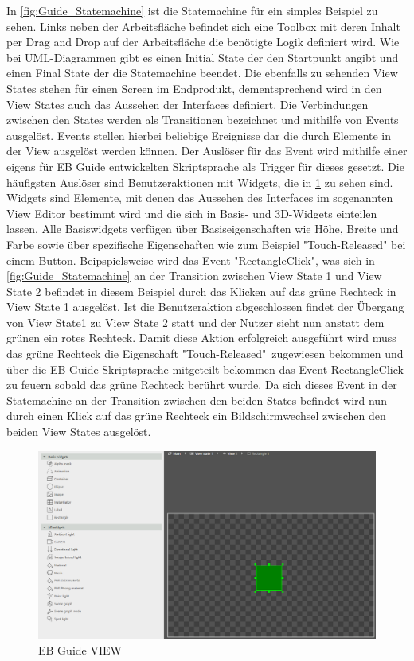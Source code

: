 In \cref{fig:Guide_Statemachine} ist die Statemachine für ein simples Beispiel zu sehen.
Links neben der Arbeitsfläche befindet sich eine Toolbox mit deren Inhalt per Drag and Drop auf der Arbeitsfläche die benötigte Logik definiert wird.
Wie bei UML-Diagrammen gibt es einen Initial State der den Startpunkt angibt und einen Final State der die Statemachine beendet.
Die ebenfalls zu sehenden View States stehen für einen Screen im Endprodukt, dementsprechend wird in den View States auch das Aussehen der Interfaces definiert.
Die Verbindungen zwischen den States werden als Transitionen bezeichnet und mithilfe von Events ausgelöst.
Events stellen hierbei beliebige Ereignisse dar die durch Elemente in der View ausgelöst werden können.
Der Auslöser für das Event wird mithilfe einer eigens für EB Guide entwickelten Skriptsprache als Trigger für dieses gesetzt.
Die häufigsten Auslöser sind Benutzeraktionen mit Widgets, die in \cref{fig:Guide_View} zu sehen sind.
Widgets sind Elemente, mit denen das Aussehen des Interfaces im sogenannten View Editor bestimmt wird und die sich in Basis- und 3D-Widgets einteilen lassen.
Alle Basiswidgets verfügen über Basiseigenschaften wie Höhe, Breite und Farbe sowie über spezifische Eigenschaften wie zum Beispiel "Touch-Released" bei einem Button.\cite{studio_guide}
Beipspielsweise wird das Event "RectangleClick", was sich in \cref{fig:Guide_Statemachine} an der Transition zwischen View State 1 und View State 2 befindet in diesem Beispiel durch das Klicken auf das grüne Rechteck in View State 1 ausgelöst.
Ist die Benutzeraktion abgeschlossen findet der Übergang von View State1 zu View State 2 statt und der Nutzer sieht nun anstatt dem grünen ein rotes Rechteck.
Damit diese Aktion erfolgreich ausgeführt wird muss das grüne Rechteck die Eigenschaft "Touch-Released"\ zugewiesen bekommen und über die EB Guide Skriptsprache mitgeteilt bekommen das Event RectangleClick zu feuern sobald das grüne Rechteck berührt wurde.
Da sich dieses Event in der Statemachine an der Transition zwischen den beiden States befindet wird nun durch einen Klick auf das grüne Rechteck ein Bildschirmwechsel zwischen den beiden View States ausgelöst.

\begin{figure}[H]
\begin{center}
  \includegraphics[scale=0.4]{figures/Guide_View.PNG}
  \caption{EB Guide VIEW}
  \label{fig:Guide_View}
\end{center}
\end{figure}


